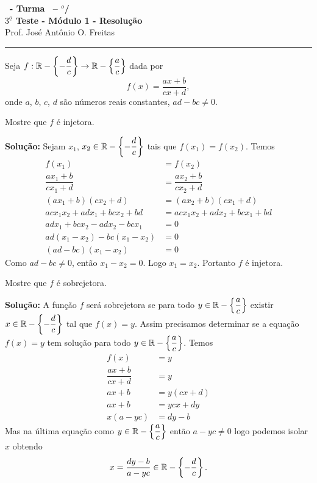 \documentclass[12pt]{exam}
\begin{document}
\begin{center}
{\Large\bf \disciplina\ - Turma \turma\ -- \semestre$^{o}$/\ano} \\ \vspace{9pt} {\large\bf
$3^{\underline{o}}$ Teste - M\'odulo 1 - Resolu\c{c}\~ao}\\
\vspace{9pt} Prof. Jos{\'e} Ant{\^o}nio O. Freitas
\end{center}
\hrule

\vspace{.6cm}

Seja $f : \mathbb{R} - \left\{-\dfrac{d}{c}\right\} \to \mathbb{R} - \left\{\dfrac{a}{c}\right\}$ dada por
\[
	f(x) =  \dfrac{ax + b}{cx + d},
\]
onde $a$, $b$, $c$, $d$ s{\~a}o n{\'u}meros reais constantes, $ad - bc \ne 0$.
\vspace{.5cm}

\questao Mostre que $f$ \'e injetora.

\noindent\textbf{Solu\c{c}\~ao:} Sejam $x_1$, $x_2 \in \mathbb{R} - \left\{-\dfrac{d}{c}\right\}$ tais que $f(x_1) = f(x_2)$. Temos
\begin{align*}
	f(x_1) &= f(x_2)\\
	\dfrac{ax_1 + b}{cx_1 + d} &= \dfrac{ax_2 + b}{cx_2 + d}\\
	(ax_1 + b)(cx_2 + d) &= (ax_2 + b)(cx_1 + d)\\
	acx_1x_2 + adx_1 + bcx_2 + bd &= acx_1x_2 + adx_2 + bcx_1 + bd\\
	adx_1 + bcx_2 - adx_2 - bcx_1 &= 0\\
	ad(x_1 - x_2) - bc(x_1 - x_2)&= 0\\
	(ad - bc)(x_1 - x_2) &= 0
\end{align*}
Como $ad - bc \ne 0$, ent\~ao $x_1 - x_2 = 0$. Logo $x_1 = x_2$. Portanto $f$ \'e injetora.

\vspace{.5cm}

\questao Mostre que $f$ \'e sobrejetora.

\noindent\textbf{Solu\c{c}\~ao:} A fun\c{c}\~ao $f$ ser\'a sobrejetora se para todo $y \in \mathbb{R} - \left\{\dfrac{a}{c}\right\}$ existir $x \in \mathbb{R} - \left\{-\dfrac{d}{c}\right\}$ tal que $f(x) = y$. Assim precisamos determinar se a equa\c{c}\~ao $f(x) = y$ tem solu\c{c}\~ao para todo $y \in \mathbb{R} - \left\{\dfrac{a}{c}\right\}$.
Temos
\begin{align*}
	f(x) &= y\\
	\dfrac{ax + b}{cx + d} &= y\\
	ax + b &= y(cx + d)\\
	ax + b &= ycx + dy\\
	x(a - yc) &= dy - b
\end{align*}
Mas na \'ultima equa\c{c}\~ao como $y \in \mathbb{R} - \left\{\dfrac{a}{c}\right\}$ ent\~ao $a - yc \ne 0$ logo podemos isolar $x$ obtendo
\[
	x = \dfrac{dy - b}{a - yc} \in \mathbb{R} - \left\{-\dfrac{d}{c}\right\}.
\]
\end{document}
